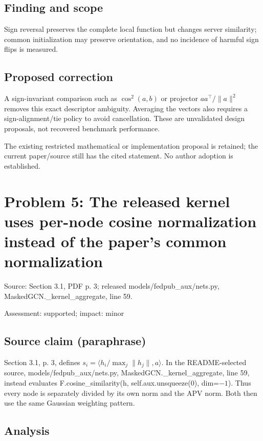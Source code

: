 \documentclass[11pt]{article}
\begin{document}
\subsection*{Finding and scope}

Sign reversal preserves the complete local function but changes server similarity; common initialization may preserve orientation, and no incidence of harmful sign flips is measured.

\subsection*{Proposed correction}

A sign-invariant comparison such as \(\cos^2(a,b)\) or projector \(aa^\top/\|a\|^2\) removes this exact descriptor ambiguity. Averaging the vectors also requires a sign-alignment/tie policy to avoid cancellation. These are unvalidated design proposals, not recovered benchmark performance.

The existing restricted mathematical or implementation proposal is retained; the current paper/source still has the cited statement. No author adoption is established.

\section*{Problem 5: The released kernel uses per-node cosine normalization instead of the paper’s common normalization}

Source: Section 3.1, PDF p. 3; released models/fedpub\_aux/nets.py, MaskedGCN.\_kernel\_aggregate, line 59.

Assessment: supported; impact: minor

\subsection*{Source claim (paraphrase)}

Section 3.1, p. 3, defines \(s_i=\langle h_i/\max_j\|h_j\|,a\rangle\). In the README-selected source, models/fedpub\_aux/nets.py, MaskedGCN.\_kernel\_aggregate, line 59, instead evaluates F.cosine\_similarity(h, self.aux.unsqueeze(\(0\)), dim=\(-1\)). Thus every node is separately divided by its own norm and the APV norm. Both then use the same Gaussian weighting pattern.

\subsection*{Analysis}
\end{document}
